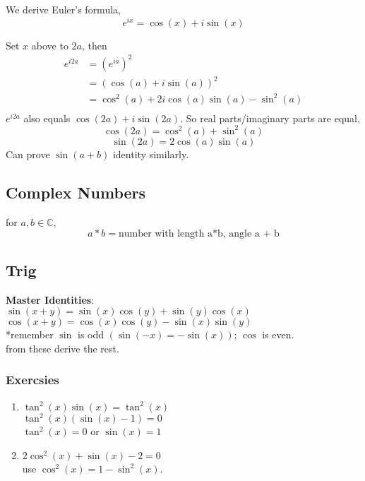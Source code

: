 \documentclass[a4paper, 12pt]{article}
\begin{document}
We derive Euler's formula, 
$$e^{ix} = \cos(x) + i\sin(x)$$

\textcolor[gray]{0.5}{
Set $x$ above to $2a$, then 
\begin{align*}
    e^{i2a} & = (e^{ia})^2\\
    & = (\cos(a) + i\sin(a))^2 \\
    & = \cos^2(a) + 2 i \cos(a) \sin(a) - \sin^2(a)\\
\end{align*}
$e^{i2a}$ also equals $\cos(2a) + i \sin(2a)$.
So real parts/imaginary parts are equal, 
$$\cos(2a) = \cos^2(a) + \sin^2(a)$$
$$\sin(2a) = 2 \cos(a) \sin(a)$$
}
Can prove $\sin(a + b)$ identity similarly.

\subsection*{Complex Numbers}
for $a, b \in \mathbb{C}$, 
$$a*b = \text{number with length a*b, angle a + b}$$


\subsection*{Trig}

\textbf{Master Identities}: \\
$\sin(x + y) = \sin(x)\cos(y) + \sin(y)\cos(x)$ \\
$\cos(x + y) = \cos(x)\cos(y) - \sin(x)\sin(y)$\\

*remember $\sin$ is odd $(\sin(-x) = -\sin(x))$; $\cos$ is even.\\

from these derive the rest.\\

\subsubsection*{Exercsies}
\begin{enumerate}
    \item $\tan^2(x) \sin(x) = \tan^2(x)$\\
\textcolor[gray]{0.5}{$\tan^2(x) (\sin(x) - 1) = 0$}\\
$\tan^2(x) = 0$ or $\sin(x) = 1$

    \item $2\cos^2(x) + \sin(x) -2 = 0$\\
\textcolor[gray]{0.5}{use $\cos^2(x) = 1 - \sin^2(x)$}.\\
\end{enumerate}
\end{document}
